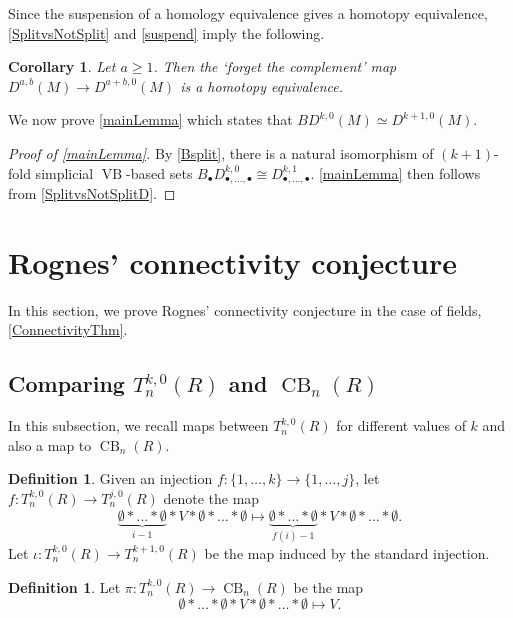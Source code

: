 \documentclass[a4paper]{amsart}
\DeclareMathOperator{\VB}{VB}
\DeclareMathOperator{\CB}{CB}
\newcommand{\m}{\to}
\numberwithin{theoremcounter}{section}
\newtheorem{corollary}[corollaryauto]{Corollary}
\theoremstyle{definition}
\newtheorem{definition}[Defauto]{Definition}
\theoremstyle{remark}
\begin{document}
Since the suspension of a homology equivalence gives a homotopy equivalence, \autoref{SplitvsNotSplit} and \autoref{suspend} imply the following. 

\begin{corollary} \label{SplitvsNotSplitD}
Let $a \geq 1$. Then the `forget the complement' map $D^{a,b}(M) \m D^{a+b,0}(M)$ is a homotopy equivalence. 
\end{corollary}

We now prove \autoref{mainLemma} which states that $B D^{k,0}(M) \simeq D^{k+1,0}(M)$.

\begin{proof}[Proof of \autoref{mainLemma}]  By \autoref{Bsplit}, there is a natural isomorphism of $(k+1)$-fold simplicial $\VB$-based sets $B_\bullet D^{k,0}_{\bullet,\dots,\bullet} \cong D^{k,1}_{\bullet,\dots,\bullet}$. \autoref{mainLemma} then follows from \autoref{SplitvsNotSplitD}. 
\end{proof}



\section{Rognes' connectivity conjecture}

In this section, we prove Rognes' connectivity conjecture in the case of fields, \autoref{ConnectivityThm}.


\subsection{Comparing $T^{k,0}_n(R)$ and ${\CB}_n(R)$}

In this subsection, we recall maps between $T^{k,0}_n(R)$ for different values of $k$ and also a map to ${\CB}_n(R)$.

\begin{definition}
Given an injection $f\colon \{1,\dots,k\} \m \{1,\dots,j\}$, let $f \colon  T_n^{k,0}(R) \m T_n^{j,0}(R)$ denote the map $$\underbrace{\emptyset * \dots * \emptyset}_{i-1} * V * \emptyset* \dots * \emptyset \longmapsto \underbrace{\emptyset * \dots * \emptyset}_{f(i)-1} * V * \emptyset* \dots * \emptyset.$$  Let $\iota \colon T_n^{k,0}(R) \m T_n^{k+1,0}(R) $ be the map induced by the standard injection.

\end{definition}

\begin{definition}
Let $\pi \colon  T_n^{k,0}(R) \m {\CB}_n(R)$ be the map  $$\emptyset * \dots * \emptyset * V * \emptyset* \dots * \emptyset \longmapsto V.$$  

\end{definition}
\end{document}
